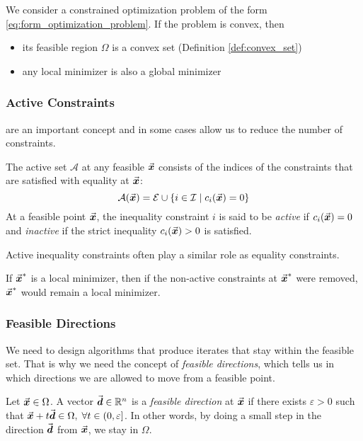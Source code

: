 \begin{lemma}\label{lem:properties_convex_problem}
  We consider a constrained optimization problem of the form \eqref{eq:form_optimization_problem}. 
  If the problem is convex, then
  \begin{itemize}
    \item its feasible region \(\Omega\) is a convex set (Definition \ref{def:convex_set})
    \item any local minimizer is also a global minimizer \qedhere
 \end{itemize}
\end{lemma}

\subsubsection{Active Constraints}\label{sec:active_constraints}
are an important concept and in some cases allow us to reduce the number of constraints.

\begin{definition}\label{def:active_set}
  The active set \(\mathcal{A}\) at any feasible \(\vec{\boldsymbol{x}}\) consists of the indices of the constraints that are satisfied with equality at \(\vec{\boldsymbol{x}}\):
  \[
  \mathcal{A}(\vect{x}) = \mathcal{E} \cup \{i \in \mathcal{I} \mid c_i(\vect{x}) = 0\}%
  \]
  At a feasible point \(\vec{\boldsymbol{x}}\), the inequality constraint \(i\) is said to be \emph{active} if \(c_i(\vec{\boldsymbol{x}}) = 0\) and \emph{inactive} if the strict inequality \(c_i(\vec{\boldsymbol{x}}) > 0\) is satisfied.
\end{definition}
Active inequality constraints often play a similar role as equality constraints.

If \(\vec{\boldsymbol{x}}^{\ast}\) is a local minimizer, then if the non-active constraints at \(\vec{\boldsymbol{x}}^{\ast}\) were removed, \(\vec{\boldsymbol{x}}^{\ast}\) would remain a local minimizer.



\subsubsection{Feasible Directions}
We need to design algorithms that produce iterates that stay within the feasible set.
That is why we need the concept of \emph{feasible directions}, which tells us in which directions we are allowed to move from a feasible point.
\begin{definition}\label{def:feasible_direction}
  Let \(\vec{\boldsymbol{x}}\in\Omega\). A vector \(\vec{\boldsymbol{d}}\in\mathbb{R}^{n}\) is a \emph{feasible direction} at \(\vec{\boldsymbol{x}}\) if there exists \(\varepsilon>0\) such that \(\vec{\boldsymbol{x}}+t\vec{\boldsymbol{d}}\in\Omega,\; \forall t\in(0,\varepsilon]\).
  In other words, by doing a small step in the direction \(\vec{\boldsymbol{d}}\) from \(\vec{\boldsymbol{x}}\), we stay in \(\Omega\).
\end{definition}

